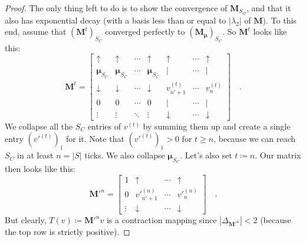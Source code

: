 \documentclass[../../main.tex]{subfiles}
\begin{document}
\begin{proof}
        The only thing left to do is to show the convergence of $\bm{M}_{S_O}$, and that it also has exponential decay (with a basis less than or equal to $|\lambda_2|$ of $\bm{M}$). To this end, assume that $(\bm{M}^t)_{S_C}$ converged perfectly to $(\bm{M_\mu})_{S_C}$. So $\bm{M}^t$ looks like this:
        \[
            \bm{M}^t =
            \begin{bmatrix}
                \uparrow & \uparrow & \cdots & \uparrow & \uparrow & \cdots & \uparrow \\
                \bm{\mu}_{S_C} & \bm{\mu}_{S_C} & \cdots & \bm{\mu}_{S_C} & \mid & \cdots & \mid \\
                \downarrow & \downarrow & \cdots & \downarrow & v^{(t)}_{n' + 1}  & \cdots & v^{(t)}_{n} \\
                0 & 0 & \cdots & 0 & \mid & \cdots & \mid \\
                \vdots & \vdots & \ddots & \vdots & \downarrow & \cdots & \downarrow
            \end{bmatrix}
            \quad .
        \]
        We collapse all the $S_C$ entries of $v^{(t)}$ by summing them up and create a single entry $(v'^{(t)})_1$ for it. Note that $(v'^{(t)})_1 > 0$ for $t \geq n$, because we can reach $S_C$ in at least $n = |S|$ ticks. We also collapse $\bm{\mu}_{S_C}$. Let's also set $t \coloneqq n$. Our matrix then looks like this:
        \[
            \bm{M}'^n =
            \begin{bmatrix}
                1 & \uparrow & \cdots & \uparrow \\
                0 & v'^{(n)}_{n' + 1}  & \cdots & v'^{(n)}_{n} \\
                \vdots & \downarrow & \cdots & \downarrow
            \end{bmatrix}
            \quad .
        \]
        But clearly, $T(v) \coloneqq \bm{M}'^n v$ is a contraction mapping since $|\Delta_{\bm{M}'^n}| < 2$ (because the top row is strictly positive).
    \end{proof}
\end{document}
